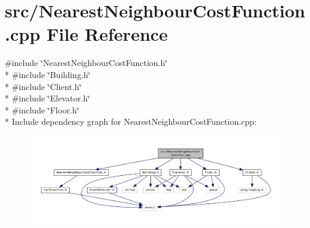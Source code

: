 \section{src/\+Nearest\+Neighbour\+Cost\+Function.cpp File Reference}
\label{_nearest_neighbour_cost_function_8cpp}
{\ttfamily \#include \char`\"{}Nearest\+Neighbour\+Cost\+Function.\+h\char`\"{}}\\*
{\ttfamily \#include \char`\"{}Building.\+h\char`\"{}}\\*
{\ttfamily \#include \char`\"{}Client.\+h\char`\"{}}\\*
{\ttfamily \#include \char`\"{}Elevator.\+h\char`\"{}}\\*
{\ttfamily \#include \char`\"{}Floor.\+h\char`\"{}}\\*
Include dependency graph for Nearest\+Neighbour\+Cost\+Function.\+cpp\+:
\nopagebreak
\begin{figure}[H]
\begin{center}
\leavevmode
\includegraphics[width=350pt]{_nearest_neighbour_cost_function_8cpp__incl}
\end{center}
\end{figure}
